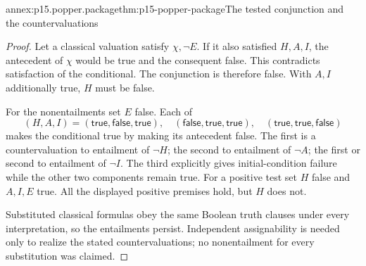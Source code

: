 \begin{annexitem}{annex:p15.popper.package}{thm:p15-popper-package}{The tested conjunction and the countervaluations}
\begin{proof}
Let a classical valuation satisfy \(\chi,\neg E\).
If it also satisfied \(H,A,I\), the antecedent of \(\chi\)
would be true and the consequent false. This contradicts
satisfaction of the conditional. The conjunction is therefore false.
With \(A,I\) additionally true, \(H\) must be false.

For the nonentailments set \(E\) false. Each of
\[
(H,A,I)=(\mathsf{true},\mathsf{false},\mathsf{true}),\quad
(\mathsf{false},\mathsf{true},\mathsf{true}),\quad
(\mathsf{true},\mathsf{true},\mathsf{false})
\]
makes the conditional true by making its antecedent false.
The first is a countervaluation to entailment of \(\neg H\);
the second to entailment of \(\neg A\); the first or second
to entailment of \(\neg I\).
The third explicitly gives initial-condition failure while the
other two components remain true.
For a positive test set \(H\) false and \(A,I,E\) true.
All the displayed positive premises hold, but \(H\) does not.

Substituted classical formulas obey the same Boolean truth clauses
under every interpretation, so the entailments persist.
Independent assignability is needed only to realize the stated
countervaluations; no nonentailment for every substitution was claimed.
\end{proof}
\end{annexitem}

